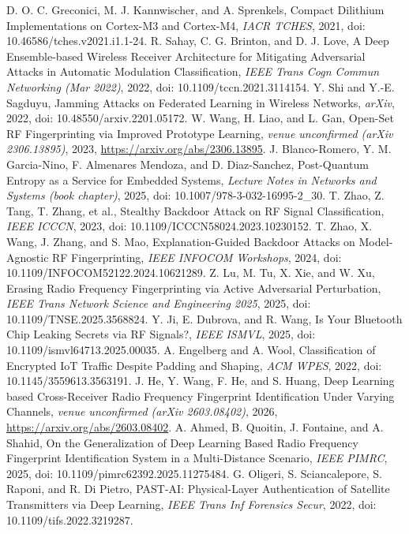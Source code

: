 D. O. C. Greconici, M. J. Kannwischer, and A. Sprenkels, Compact Dilithium Implementations on Cortex-M3 and Cortex-M4, \emph{IACR TCHES}, 2021, doi: 10.46586/tches.v2021.i1.1-24.
R. Sahay, C. G. Brinton, and D. J. Love, A Deep Ensemble-based Wireless Receiver Architecture for Mitigating Adversarial Attacks in Automatic Modulation Classification, \emph{IEEE Trans Cogn Commun Networking (Mar 2022)}, 2022, doi: 10.1109/tccn.2021.3114154.
Y. Shi and Y.-E. Sagduyu, Jamming Attacks on Federated Learning in Wireless Networks, \emph{arXiv}, 2022, doi: 10.48550/arxiv.2201.05172.
W. Wang, H. Liao, and L. Gan, Open-Set RF Fingerprinting via Improved Prototype Learning, \emph{venue unconfirmed (arXiv 2306.13895)}, 2023, \url{https://arxiv.org/abs/2306.13895}.
J. Blanco-Romero, Y. M. Garcia-Nino, F. Almenares Mendoza, and D. Diaz-Sanchez, Post-Quantum Entropy as a Service for Embedded Systems, \emph{Lecture Notes in Networks and Systems (book chapter)}, 2025, doi: 10.1007/978-3-032-16995-2\_30.
T. Zhao, Z. Tang, T. Zhang, et al., Stealthy Backdoor Attack on RF Signal Classification, \emph{IEEE ICCCN}, 2023, doi: 10.1109/ICCCN58024.2023.10230152.
T. Zhao, X. Wang, J. Zhang, and S. Mao, Explanation-Guided Backdoor Attacks on Model-Agnostic RF Fingerprinting, \emph{IEEE INFOCOM Workshops}, 2024, doi: 10.1109/INFOCOM52122.2024.10621289.
Z. Lu, M. Tu, X. Xie, and W. Xu, Erasing Radio Frequency Fingerprinting via Active Adversarial Perturbation, \emph{IEEE Trans Network Science and Engineering 2025}, 2025, doi: 10.1109/TNSE.2025.3568824.
Y. Ji, E. Dubrova, and R. Wang, Is Your Bluetooth Chip Leaking Secrets via RF Signals?, \emph{IEEE ISMVL}, 2025, doi: 10.1109/ismvl64713.2025.00035.
A. Engelberg and A. Wool, Classification of Encrypted IoT Traffic Despite Padding and Shaping, \emph{ACM WPES}, 2022, doi: 10.1145/3559613.3563191.
J. He, Y. Wang, F. He, and S. Huang, Deep Learning based Cross-Receiver Radio Frequency Fingerprint Identification Under Varying Channels, \emph{venue unconfirmed (arXiv 2603.08402)}, 2026, \url{https://arxiv.org/abs/2603.08402}.
A. Ahmed, B. Quoitin, J. Fontaine, and A. Shahid, On the Generalization of Deep Learning Based Radio Frequency Fingerprint Identification System in a Multi-Distance Scenario, \emph{IEEE PIMRC}, 2025, doi: 10.1109/pimrc62392.2025.11275484.
G. Oligeri, S. Sciancalepore, S. Raponi, and R. Di Pietro, PAST-AI: Physical-Layer Authentication of Satellite Transmitters via Deep Learning, \emph{IEEE Trans Inf Forensics Secur}, 2022, doi: 10.1109/tifs.2022.3219287.
